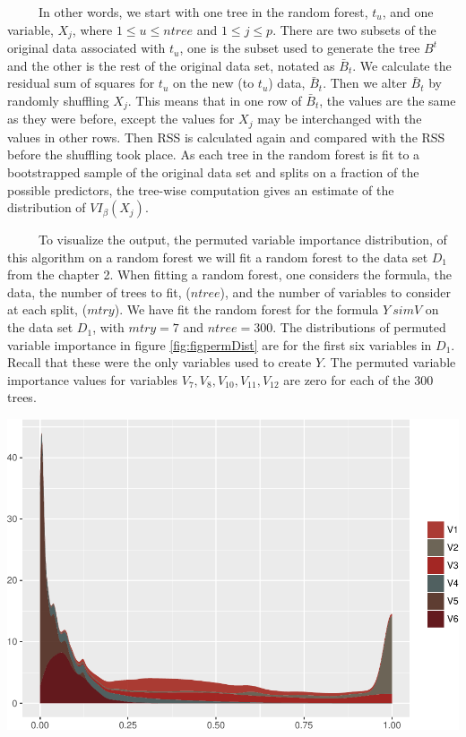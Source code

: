 \documentclass[12pt,twoside]{reedthesis}
\let\origfigure\figure
\let\endorigfigure\endfigure
\renewenvironment{figure}[1][2] {
    \expandafter\origfigure\expandafter[H]
} {
    \endorigfigure
}
\begin{document}
  ~~~~~In other words, we start with one tree in the random forest,
  \(t_u\), and one variable, \(X_j\), where \(1 \leq u \leq ntree\) and
  \(1 \leq j \leq p\). There are two subsets of the original data
  associated with \(t_u\), one is the subset used to generate the tree
  \({B}^t\) and the other is the rest of the original data set, notated as
  \(\bar{B}_t\). We calculate the residual sum of squares for \(t_u\) on
  the new (to \(t_u\)) data, \(\bar{B}_t\). Then we alter \(\bar{B}_t\) by
  randomly shuffling \(X_j\). This means that in one row of \(\bar{B}_t\),
  the values are the same as they were before, except the values for
  \(X_j\) may be interchanged with the values in other rows. Then RSS is
  calculated again and compared with the RSS before the shuffling took
  place. As each tree in the random forest is fit to a bootstrapped sample
  of the original data set and splits on a fraction of the possible
  predictors, the tree-wise computation gives an estimate of the
  distribution of \(VI_{\beta}(X_j)\).
  
  ~~~~~To visualize the output, the permuted variable importance
  distribution, of this algorithm on a random forest we will fit a random
  forest to the data set \(D_1\) from the chapter 2. When fitting a random
  forest, one considers the formula, the data, the number of trees to fit,
  (\(ntree\)), and the number of variables to consider at each split,
  (\(mtry\)). We have fit the random forest for the formula \(Y \ sim V\)
  on the data set \(D_1\), with \(mtry = 7\) and \(ntree = 300\). The
  distributions of permuted variable importance in figure
  \ref{fig:figpermDist} are for the first six variables in \(D_1\). Recall
  that these were the only variables used to create \(Y\). The permuted
  variable importance values for variables
  \(V_7,V_8,V_{10},V_{11},V_{12}\) are zero for each of the 300 trees.
  
  \begin{figure}[htbp]
  \centering
  \includegraphics{Thesis_files/figure-latex/unnamed-chunk-25-1.pdf}
  \caption{\label{fig:unnamed-chunk-25}\label{fig:figpermDist}The distribution
  of permuted variable importance for the first six variables in D1.}
  \end{figure}
  
\end{document}
